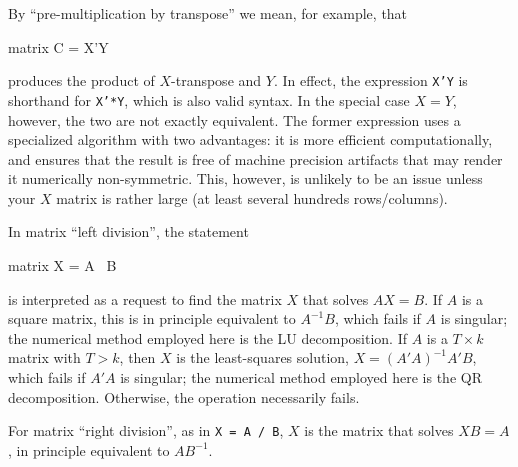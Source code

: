 By ``pre-multiplication by transpose'' we mean, for example, that 
%
\begin{code}
matrix C = X'Y
\end{code}
%
produces the product of $X$-transpose and $Y$.  In effect, the
expression \texttt{X'Y} is shorthand for \texttt{X'*Y}, which is also
valid syntax. In the special case $X = Y$, however, the two are not
exactly equivalent. The former expression uses a specialized algorithm
with two advantages: it is more efficient computationally, and ensures
that the result is free of machine precision artifacts that may render
it numerically non-symmetric. This, however, is unlikely to be an
issue unless your $X$ matrix is rather large (at least several
hundreds rows/columns).

In matrix ``left division'', the statement 
%
\begin{code}
matrix X = A \ B
\end{code}
%
is interpreted as a request to find the matrix $X$ that solves $AX=B$.
If $A$ is a square matrix, this is in principle equivalent to $A^{-1}B$,
which fails if $A$ is singular; the numerical method employed here is
the LU decomposition.  If $A$ is a $T \times k$ matrix with
$T > k$, then $X$ is the least-squares solution, $X = (A'A)^{-1}A'B$,
which fails if $A'A$ is singular; the numerical method employed here is
the QR decomposition.  Otherwise, the operation necessarily fails.

For matrix ``right division'', as in \texttt{X = A / B}, $X$ is the
matrix that solves $XB = A$, in principle equivalent to $AB^{-1}$.

